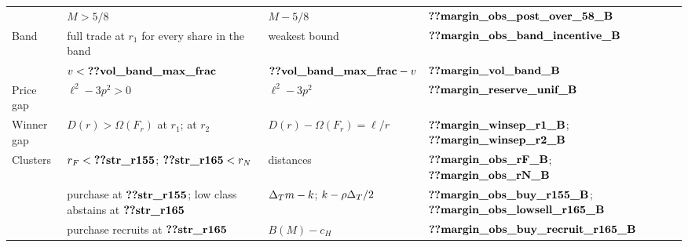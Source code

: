 \begin{table}[tbp]
\begin{tabular}{@{}llll@{}}
 & \(M>5/8\) & \(M-5/8\) & \(\reg{margin_obs_post_over_58_B}\)\\
Band & full trade at \(r_1\) for every share in the band & weakest bound & \(\reg{margin_obs_band_incentive_B}\)\\
 & \(v<\reg{vol_band_max_frac}\) & \(\reg{vol_band_max_frac}-v\) & \(\reg{margin_vol_band_B}\)\\
Price gap & \(\ell^2-3p^2>0\) & \(\ell^2-3p^2\) & \(\reg{margin_reserve_unif_B}\)\\
Winner gap & \(D(r)>\Omega(F_r)\) at \(r_1\); at \(r_2\) & \(D(r)-\Omega(F_r)=\ell/r\) & \(\reg{margin_winsep_r1_B}\); \(\reg{margin_winsep_r2_B}\)\\
Clusters & \(r_F<\reg{str_r155}\); \(\reg{str_r165}<r_N\) & distances & \(\reg{margin_obs_rF_B}\); \(\reg{margin_obs_rN_B}\)\\
 & purchase at \(\reg{str_r155}\); low class abstains at \(\reg{str_r165}\) & \(\Delta_T m-k\); \(k-\rho\Delta_T/2\) & \(\reg{margin_obs_buy_r155_B}\); \(\reg{margin_obs_lowsell_r165_B}\)\\
 & purchase recruits at \(\reg{str_r165}\) & \(B(M)-c_H\) & \(\reg{margin_obs_buy_recruit_r165_B}\)\\
\bottomrule
\end{tabular}
\end{table}

